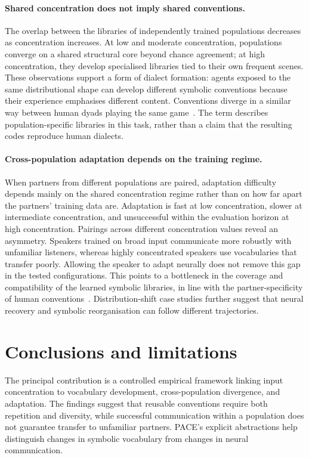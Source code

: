 \documentclass[%
    12pt, %
    oneside, %
    a4paper, %
    notitlepage, %
]{article}
\begin{document}
\paragraph{Shared concentration does not imply shared conventions.}
The overlap between the libraries of independently trained populations decreases as concentration increases. At low and moderate concentration, populations converge on a shared structural core beyond chance agreement; at high concentration, they develop specialised libraries tied to their own frequent scenes. These observations support a form of dialect formation: agents exposed to the same distributional shape can develop different symbolic conventions because their experience emphasises different content. Conventions diverge in a similar way between human dyads playing the same game~\cite{mccarthy_learning_2021}. The term describes population-specific libraries in this task, rather than a claim that the resulting codes reproduce human dialects.

\paragraph{Cross-population adaptation depends on the training regime.}
When partners from different populations are paired, adaptation difficulty depends mainly on the shared concentration regime rather than on how far apart the partners' training data are. Adaptation is fast at low concentration, slower at intermediate concentration, and unsuccessful within the evaluation horizon at high concentration. Pairings across different concentration values reveal an asymmetry. Speakers trained on broad input communicate more robustly with unfamiliar listeners, whereas highly concentrated speakers use vocabularies that transfer poorly. Allowing the speaker to adapt neurally does not remove this gap in the tested configurations. This points to a bottleneck in the coverage and compatibility of the learned symbolic libraries, in line with the partner-specificity of human conventions~\cite{brennan_conceptual_1996}. Distribution-shift case studies further suggest that neural recovery and symbolic reorganisation can follow different trajectories.

\section*{Conclusions and limitations}

The principal contribution is a controlled empirical framework linking input concentration to vocabulary development, cross-population divergence, and adaptation. The findings suggest that reusable conventions require both repetition and diversity, while successful communication within a population does not guarantee transfer to unfamiliar partners. PACE's explicit abstractions help distinguish changes in symbolic vocabulary from changes in neural communication.
\end{document}
